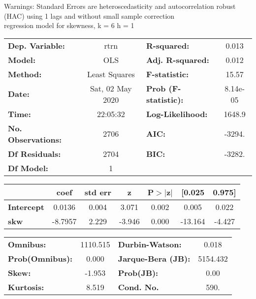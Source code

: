 Warnings: \newline
 [1] Standard Errors are heteroscedasticity and autocorrelation robust (HAC) using 1 lags and without small sample correction\\ 

regression model for skewness, k = 6 h = 1\begin{center}
\begin{tabular}{lclc}
\toprule
\textbf{Dep. Variable:}    &       rtrn       & \textbf{  R-squared:         } &     0.013   \\
\textbf{Model:}            &       OLS        & \textbf{  Adj. R-squared:    } &     0.012   \\
\textbf{Method:}           &  Least Squares   & \textbf{  F-statistic:       } &     15.57   \\
\textbf{Date:}             & Sat, 02 May 2020 & \textbf{  Prob (F-statistic):} &  8.14e-05   \\
\textbf{Time:}             &     22:05:32     & \textbf{  Log-Likelihood:    } &    1648.9   \\
\textbf{No. Observations:} &        2706      & \textbf{  AIC:               } &    -3294.   \\
\textbf{Df Residuals:}     &        2704      & \textbf{  BIC:               } &    -3282.   \\
\textbf{Df Model:}         &           1      & \textbf{                     } &             \\
\bottomrule
\end{tabular}
\begin{tabular}{lcccccc}
                   & \textbf{coef} & \textbf{std err} & \textbf{z} & \textbf{P$> |$z$|$} & \textbf{[0.025} & \textbf{0.975]}  \\
\midrule
\textbf{Intercept} &       0.0136  &        0.004     &     3.071  &         0.002        &        0.005    &        0.022     \\
\textbf{skw}       &      -8.7957  &        2.229     &    -3.946  &         0.000        &      -13.164    &       -4.427     \\
\bottomrule
\end{tabular}
\begin{tabular}{lclc}
\textbf{Omnibus:}       & 1110.515 & \textbf{  Durbin-Watson:     } &    0.018  \\
\textbf{Prob(Omnibus):} &   0.000  & \textbf{  Jarque-Bera (JB):  } & 5154.432  \\
\textbf{Skew:}          &  -1.953  & \textbf{  Prob(JB):          } &     0.00  \\
\textbf{Kurtosis:}      &   8.519  & \textbf{  Cond. No.          } &     590.  \\
\bottomrule
\end{tabular}
\end{center}

